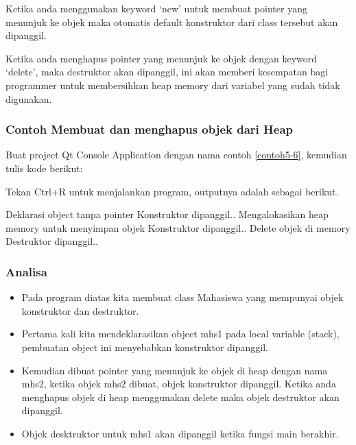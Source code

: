 

Ketika anda menggunakan keyword `new' untuk membuat pointer yang
menunjuk ke objek maka otomatis default konstruktor dari class tersebut
akan dipanggil.

Ketika anda menghapus pointer yang menunjuk ke objek dengan keyword
`delete', maka destruktor akan dipanggil, ini akan memberi kesempatan
bagi programmer untuk membersihkan heap memory dari variabel yang sudah
tidak digunakan.

\subsubsection*{Contoh  Membuat dan menghapus objek dari Heap}

Buat project Qt Console Application dengan nama contoh \ref{contoh5-6}, kemudian tulis
kode berikut:



Tekan Ctrl+R untuk menjalankan program, outputnya adalah sebagai
berikut.

\begin{lcverbatim}
Deklarasi object tanpa pointer
Konstruktor dipanggil..
Mengalokasikan heap memory untuk menyimpan objek
Konstruktor dipanggil..
Delete objek di memory
Destruktor dipanggil..
\end{lcverbatim}

\subsubsection*{Analisa}

\begin{itemize}

\item
  Pada program diatas kita membuat class Mahasiswa yang mempunyai objek
  konstruktor dan destruktor.
\item
  Pertama kali kita mendeklarasikan object mhs1 pada local variable
  (stack), pembuatan object ini menyebabkan konstruktor dipanggil.
\item
  Kemudian dibuat pointer yang menunjuk ke objek di heap dengan nama
  mhs2, ketika objek mhs2 dibuat, objek konstruktor dipanggil. Ketika
  anda menghapus objek di heap menggunakan delete maka objek destruktor
  akan dipanggil.
\item
  Objek desktruktor untuk mhs1 akan dipanggil ketika fungsi main
  berakhir.
\end{itemize}

